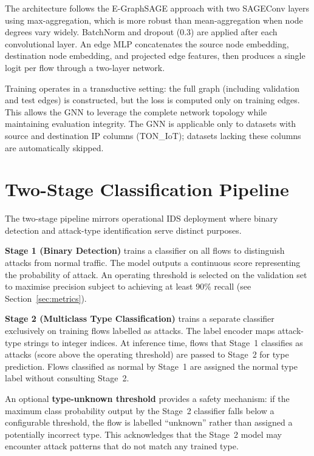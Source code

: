 \documentclass[12pt,a4paper]{report}
\begin{document}
The architecture follows the E-GraphSAGE approach \citep{lo2023} with two SAGEConv layers using max-aggregation, which is more robust than mean-aggregation when node degrees vary widely. BatchNorm and dropout (0.3) are applied after each convolutional layer. An edge MLP concatenates the source node embedding, destination node embedding, and projected edge features, then produces a single logit per flow through a two-layer network.

Training operates in a transductive setting: the full graph (including validation and test edges) is constructed, but the loss is computed only on training edges. This allows the GNN to leverage the complete network topology while maintaining evaluation integrity. The GNN is applicable only to datasets with source and destination IP columns (TON\_IoT); datasets lacking these columns are automatically skipped.

\section{Two-Stage Classification Pipeline}
\label{sec:two-stage}

The two-stage pipeline mirrors operational IDS deployment where binary detection and attack-type identification serve distinct purposes.

\textbf{Stage 1 (Binary Detection)} trains a classifier on all flows to distinguish attacks from normal traffic. The model outputs a continuous score representing the probability of attack. An operating threshold is selected on the validation set to maximise precision subject to achieving at least 90\% recall (see Section~\ref{sec:metrics}).

\textbf{Stage 2 (Multiclass Type Classification)} trains a separate classifier exclusively on training flows labelled as attacks. The label encoder maps attack-type strings to integer indices. At inference time, flows that Stage~1 classifies as attacks (score above the operating threshold) are passed to Stage~2 for type prediction. Flows classified as normal by Stage~1 are assigned the normal type label without consulting Stage~2.

An optional \textbf{type-unknown threshold} provides a safety mechanism: if the maximum class probability output by the Stage~2 classifier falls below a configurable threshold, the flow is labelled ``unknown'' rather than assigned a potentially incorrect type. This acknowledges that the Stage~2 model may encounter attack patterns that do not match any trained type.
\end{document}
